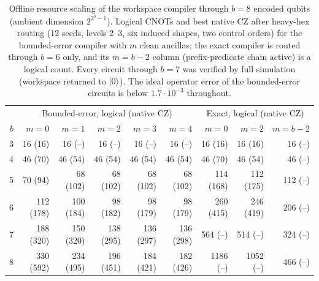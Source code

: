 \begin{table}[htbp]\centering\small
\caption{Offline resource scaling of the workspace compiler through $b=8$ encoded qubits (ambient dimension $2^{2^b-1}$). Logical CNOTs and best native CZ after heavy-hex routing (12 seeds, levels 2--3, six induced shapes, two control orders) for the bounded-error compiler with $m$ clean ancillas; the exact compiler is routed through $b=6$ only, and its $m{=}b{-}2$ column (prefix-predicate chain active) is a logical count. Every circuit through $b=7$ was verified by full simulation (workspace returned to $\lvert 0\rangle$). The ideal operator error of the bounded-error circuits is below $1.7\cdot10^{-3}$ throughout.}\label{tab:q3-scaling}
\begin{tabular}{r rrrrr rrr}\toprule & \multicolumn{5}{c}{Bounded-error, logical (native CZ)} & \multicolumn{3}{c}{Exact, logical (native CZ)}\\ $b$ & $m{=}0$ & $m{=}1$ & $m{=}2$ & $m{=}3$ & $m{=}4$ & $m{=}0$ & $m{=}2$ & $m{=}b{-}2$\\\midrule
3 & 16 (16) & 16 (--) & 16 (--) & 16 (--) & 16 (--) & 16 (16) & 16 (16) & 16 (--)\\
4 & 46 (70) & 46 (54) & 46 (54) & 46 (54) & 46 (54) & 46 (70) & 46 (54) & 46 (--)\\
5 & 70 (94) & 68 (102) & 68 (102) & 68 (102) & 68 (102) & 114 (168) & 112 (175) & 112 (--)\\
6 & 112 (178) & 100 (184) & 98 (182) & 98 (179) & 98 (179) & 260 (415) & 246 (419) & 206 (--)\\
7 & 188 (320) & 150 (320) & 138 (295) & 136 (297) & 136 (298) & 564 (--) & 514 (--) & 324 (--)\\
8 & 330 (592) & 234 (495) & 196 (451) & 184 (421) & 182 (426) & 1186 (--) & 1052 (--) & 466 (--)\\
\bottomrule\end{tabular}\end{table}
